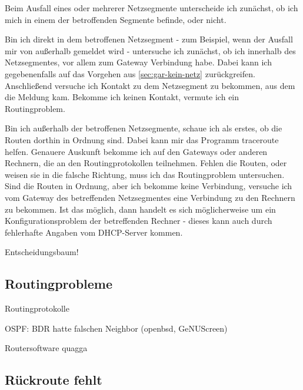 \begin{normaltext}
  Beim Ausfall eines oder mehrerer Netzsegmente unterscheide ich zunächst, ob
  ich mich in einem der betroffenden Segmente befinde, oder nicht.

  Bin ich direkt in dem betroffenen Netzsegment - zum Beispiel, wenn der
  Ausfall mir von außerhalb gemeldet wird - untersuche ich zunächst, ob ich
  innerhalb des Netzsegmentes, vor allem zum Gateway Verbindung habe.
  Dabei kann ich gegebenenfalls auf das Vorgehen aus
  \ref{sec:gar-kein-netz} zurückgreifen.
  Anschließend versuche ich Kontakt zu dem Netzsegment zu bekommen, aus dem
  die Meldung kam. Bekomme ich keinen Kontakt, vermute ich ein Routingproblem.

  Bin ich außerhalb der betroffenen Netzsegmente, schaue ich als erstes, ob
  die Routen dorthin in Ordnung sind. Dabei kann mir das Programm traceroute
  helfen. Genauere Auskunft bekomme ich auf den Gateways oder anderen
  Rechnern, die an den Routingprotokollen teilnehmen. Fehlen die Routen, oder
  weisen sie in die falsche Richtung, muss ich das Routingproblem untersuchen.
  Sind die Routen in Ordnung, aber ich bekomme keine Verbindung, versuche ich
  vom Gateway des betreffenden Netzsegmentes eine Verbindung zu den Rechnern
  zu bekommen. Ist das möglich, dann handelt es sich möglicherweise um ein
  Konfigurationsproblem der betreffenden Rechner - dieses kann auch durch
  fehlerhafte Angaben vom DHCP-Server kommen.
\end{normaltext}

\begin{notes}
\item Entscheidungsbaum!
\end{notes}

\subsection{Routingprobleme}
\label{sec:routingprobleme}

\begin{notes}
\item Routingprotokolle
\item OSPF: BDR hatte falschen Neighbor (openbsd, GeNUScreen)
\item Routersoftware quagga
\end{notes}

\subsection{Rückroute fehlt}
\label{sec:rueckroute-fehlt}

